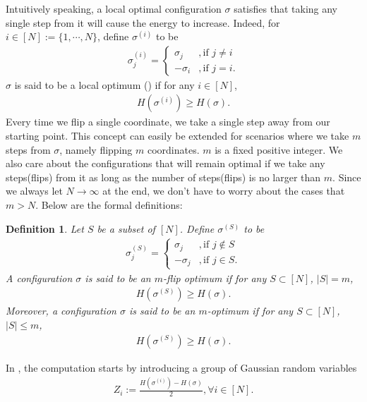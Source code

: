 \documentclass[10pt]{article}
\newtheorem{definition}{\bf Definition}
\newenvironment{Proof of lemma}{\noindent{\bf Proof of Lemma}}{\hfill$\Box$\newline}
\newenvironment{Proof of claim}{\noindent{\bf Proof of claim}}{\hfill$\Box$\newline}
\newenvironment{Proof of theorem}{\noindent{\bf Proof of Theorem}}{\hfill\scriptsize{$\Box$}\newline}
\newenvironment{Proof of theorems}{\noindent{\bf Proof of Theorems}}{\hfill$\Box$\newline}
\newenvironment{Proof of proposition}{\noindent{\bf Proof of Proposition}}{\hfill$\Box$\newline}
\newenvironment{Proof of propositions}{\noindent{\bf Proof of Propositions}}{\hfill$\Box$\newline}
\newenvironment{Proof of exercise}{\noindent{\it Proof of Exercise:}}{\hfill$\Box$}
\numberwithin{equation}{section}
\begin{document}
Intuitively speaking, a local optimal configuration $\sigma$ satisfies that taking any single step from it will cause the energy to increase. Indeed, for $i \in [N]:= \{1,\cdots, N\}$, define $\sigma^{(i)}$ to be
\begin{align}
    \sigma^{(i)}_j = 
    \begin{cases}
        \sigma_j&,  \text{if $j \neq i$} \\
        -\sigma_i&,  \text{if $j = i$}.
    \end{cases}
\end{align}
$\sigma$ is said to be a local optimum (\cite{SK_optimal}) if for any $i \in [N]$,
\begin{align}
    H(\sigma^{(i)}) \geq H(\sigma).
\end{align}
Every time we flip a single coordinate, we take a single step away from our starting point. This concept can easily be extended for scenarios where we take $m$ steps from $\sigma$, namely flipping $m$ coordinates. $m$ is a fixed positive integer. We also care about the configurations that will remain optimal if we take any steps(flips) from it as long as the number of steps(flips) is no larger than $m$. Since we always let $N \to \infty$ at the end, we don't have to worry about the cases that $m > N$. Below are the formal definitions:
\begin{definition} \label{mlo_def}
    Let $S$ be a subset of $[N]$. Define $\sigma^{(S)}$ to be
    \begin{align}
        \sigma^{(S)}_j = 
        \begin{cases}
            \sigma_j&,  \text{if $j \notin S$} \\
            -\sigma_j&,  \text{if $j \in S$}.
        \end{cases}
    \end{align}
    A configuration $\sigma$ is said to be an $m$-flip optimum if for any $S \subset [N]$, $|S|=m$,
    \begin{align}
        H(\sigma^{(S)}) \geq H(\sigma).
    \end{align}
    Moreover, a configuration $\sigma$ is said to be an $m$-optimum if for any $S \subset [N]$, $|S|\leq m$,
    \begin{align}
        H(\sigma^{(S)}) \geq H(\sigma).
    \end{align}
\end{definition}
In \cite{SK_optimal}, the computation starts by introducing a group of Gaussian random variables
\begin{align}
    Z_i := \frac{H(\sigma^{(i)}) - H(\sigma)}{2} , \forall i \in [N].
\end{align}
\end{document}
